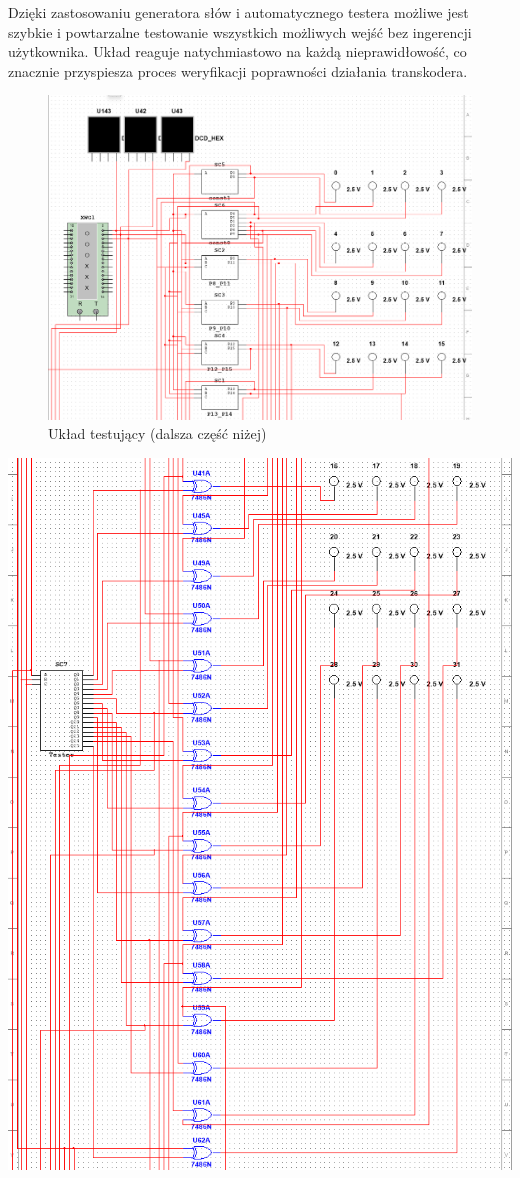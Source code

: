\documentclass[11pt]{article}
\begin{document}
Dzięki zastosowaniu generatora słów i automatycznego testera możliwe jest szybkie i powtarzalne
testowanie wszystkich możliwych wejść bez ingerencji użytkownika. Układ reaguje natychmiastowo na
każdą nieprawidłowość, co znacznie przyspiesza proces weryfikacji poprawności działania transkodera.

\begin{figure}[H]
\centering
\includegraphics[width=.9\linewidth]{../uklad_testujacy_cw0_gora.png}
\caption{Układ testujący (dalsza część niżej)}
\end{figure}
\begin{center}
\includegraphics[width=.9\linewidth]{../uklad_testujacy_cw0_srodek.png}
\end{center}
\end{document}
